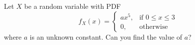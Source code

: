 \medskip
    
        
        
\begin{problem}
    Let $X$ be a random variable with PDF
    \[
    f_X(x) = \begin{cases}
        ax^5,& \text{if }0\le x \le 3 \\
        0,& \text{otherwise}
    \end{cases}
    \]
where $a$ is an unknown constant. Can you find the value of $a$?
\end{problem}
